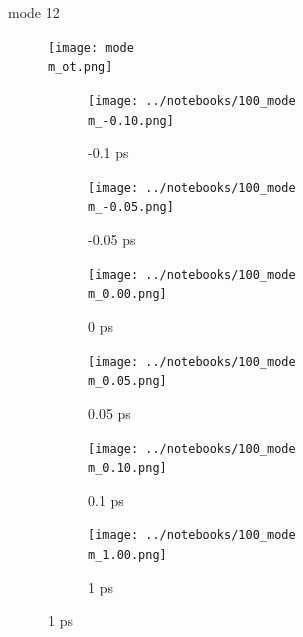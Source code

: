 \documentclass{beamer}
\newcommand\w{0.32}
\begin{document}
\renewcommand\m{12}
\begin{frame}{mode \m}
		\vspace{\vh mm}
	\begin{figure}
		\centering
		\texttt{[image: mode\\m\_ot.png]}
	\end{figure}
	\begin{figure}
		\centering
		\begin{subfigure}[b]{\w\textwidth}
			\centering
			\texttt{[image: ../notebooks/100\_mode\\m\_-0.10.png]}
			\caption{-0.1 ps}
		\end{subfigure}
		\begin{subfigure}[b]{\w\textwidth}
			\centering
			\texttt{[image: ../notebooks/100\_mode\\m\_-0.05.png]}
			\caption{-0.05 ps}
		\end{subfigure}
		\begin{subfigure}[b]{\w\textwidth}
			\centering
			\texttt{[image: ../notebooks/100\_mode\\m\_0.00.png]}
			\caption{0 ps}
		\end{subfigure}
		\begin{subfigure}[b]{\w\textwidth}
			\centering
			\texttt{[image: ../notebooks/100\_mode\\m\_0.05.png]}
			\caption{0.05 ps}
		\end{subfigure}
		\begin{subfigure}[b]{\w\textwidth}
			\centering
			\texttt{[image: ../notebooks/100\_mode\\m\_0.10.png]}
			\caption{0.1 ps}
		\end{subfigure}
		\begin{subfigure}[b]{\w\textwidth}
			\centering
			\texttt{[image: ../notebooks/100\_mode\\m\_1.00.png]}
			\caption{1 ps}
		\end{subfigure}
	\end{figure}
\end{frame}
\end{document}
